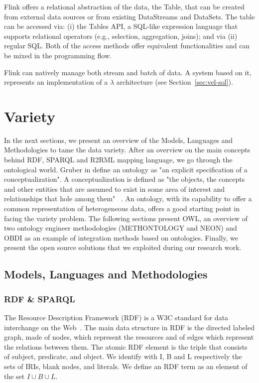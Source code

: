 Flink offers a relational abstraction of the data, the Table, that can be created from external data sources or from existing DataStreams and DataSets. The table can be accessed via: (i) the Tables API, a SQL-like expression language that supports relational operators (e.g., selection, aggregation, joins); and via (ii) regular SQL. Both of the access methods offer equivalent functionalities and can be mixed in the programming flow.

Flink can natively manage both stream and batch of data. A system based on it, represents an implementation of a $\lambda$ architecture (see Section~\ref{sec:vel-sol}).

\section{Variety}\label{sec:variety}
In the next sections, we present an overview of the Models, Languages and Methodologies to tame the data variety. After an overview on the main concepts behind RDF, SPARQL and R2RML mapping language, we go through the ontological world.
Gruber in \cite{DBLP:journals/ijmms/Gruber95} define an ontology as "an explicit specification of a conceptualization". A conceptualization is defined as "the objects, the concepts and other entities that are assumed to exist in some area of interest and relationships that hole among them" ~\cite{DBLP:books/daglib/0005829}. An ontology, with its capability to offer a common representation of heterogeneous data, offers a good starting point in facing the variety problem.
The following sections present OWL, an overview of two ontology engineer methodologies (METHONTOLOGY and NEON) and OBDI as an example of integration methods based on ontologies.   
Finally, we present the open source solutions that we exploited during our research work.

\subsection{Models, Languages and Methodologies}

\subsubsection{RDF \& SPARQL}\label{sec:rdf-sparql}
The Resource Description Framework (RDF) is a W3C standard for data interchange on the Web~\cite{cyganiak2014rdf}. 
The main data structure in RDF is the directed labeled graph, made of nodes, which represent the resources and of edges which represent the relations between them. The atomic RDF element is the triple that consists of subject, predicate, and object. We identify with I, B and L respectively the sets of IRIs, blank nodes, and literals. We define an RDF term as an element of the set $I \cup B \cup L$.

